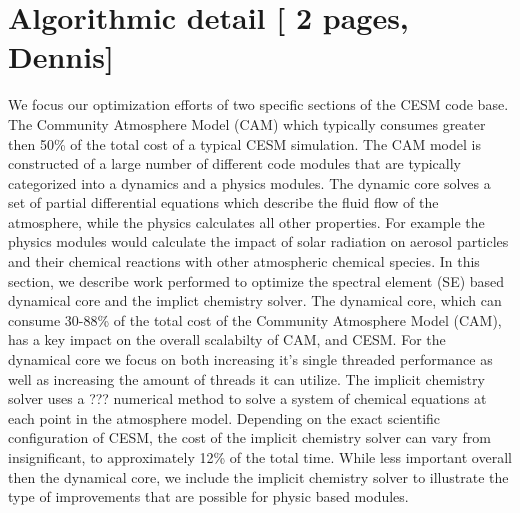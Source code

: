 \section{Algorithmic detail [{\color{red} 2 pages, Dennis}]}\label{sec:algorithm}

  We focus our optimization efforts of two specific sections of the CESM code base. The 
 Community Atmosphere Model (CAM) which typically consumes greater then 50\% of the total cost of a typical 
 CESM simulation.  The CAM model is constructed of a large number of different code modules that are typically 
 categorized into a dynamics and a physics modules.  The dynamic core solves a set of partial differential equations
 which describe the fluid flow of the atmosphere, while the physics calculates all other properties.  For example the physics 
 modules would calculate the impact of solar radiation on aerosol particles and their chemical reactions with other 
 atmospheric chemical species.  In this section, we describe work performed to optimize the  spectral element (SE) based
  dynamical core and the implict chemistry solver.  The dynamical core, which can consume 30-88\% of the total cost of the Community Atmosphere Model (CAM), has  a key impact on the overall scalabilty of CAM, and CESM.  For the dynamical core we focus on 
both increasing it's single threaded performance as well as increasing the amount of threads it can utilize.  
The implicit chemistry solver  uses a ??? numerical method to solve a system of chemical equations at each point 
in the atmosphere model.  Depending on the exact scientific configuration of CESM, the cost of the implicit chemistry solver can 
vary from insignificant, to approximately 12\% of the total time.  While less important overall then the dynamical core, we include the 
implicit chemistry solver to illustrate the type of improvements that are possible for physic based modules.  


